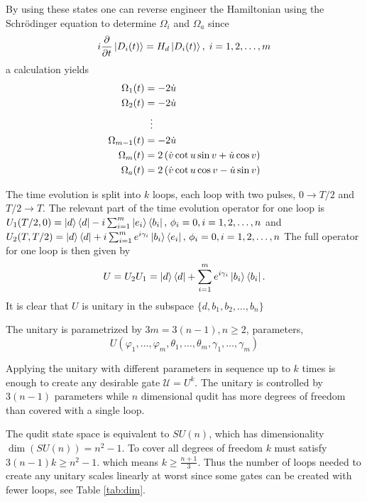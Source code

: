 By using these states one can reverse engineer the Hamiltonian using the Schrödinger equation to determine $\Omega_i$ and $\Omega_a$ since 
\begin{equation}
i\pdv{}{t}\ket{D_i(t)} = H_d\ket{D_i(t)},\; i = 1,2,\dots,m
\end{equation}
a calculation yields
\begin{equation}
\begin{aligned}
\Omega_1(t) &= -2\dot{u}
\\ 
\Omega_2(t) &= -2\dot{u}
\\
&\hspace{2mm}\vdots
\\
\Omega_{m-1}(t) &= -2\dot{u}
\\
\Omega_m(t) &= 2\left(\dot{v}\cot u\sin v + \dot{u}\cos v \right)
\\
\Omega_a(t) &= 2\left(\dot{v}\cot u\cos v - \dot{u}\sin v \right)
\end{aligned}
\end{equation}

The time evolution is split into $k$ loops, each loop with two pulses, $0 \longrightarrow T/2$ and $T/2 \longrightarrow T$. The relevant part of the time evolution operator for one loop is  
$U_1(T/2,0) = \ket{d}\bra{d} -i\sum_{i = 1}^m \ket{e_i}\bra{b_i},\, \phi_i = 0, i = 1,2,\dots,n$ and $U_2(T,T/2) = \ket{d}\bra{d} + i\sum_{i = 1}^m e^{i\gamma_i}\ket{b_i}\bra{e_i},\, \phi_i = 0, i = 1,2,\dots,n $
The full operator for one loop is then given by 
\begin{equation}
U = U_2U_1 = \ket{d}\bra{d} + \sum_{i = 1}^{m}e^{i\gamma_i}\ket{b_i}\bra{b_i}.
\end{equation}
It is clear that $U$ is unitary in the subspace $\{d,b_1,b_2,\dots, b_n\}$

The unitary is parametrized by $3m = 3(n-1), n\geq 2$, parameters,
\begin{equation}
U(\varphi_1,\dots,\varphi_m,\theta_1,\dots,\theta_m,\gamma_1,\dots,\gamma_m) 
\end{equation} 

Applying the unitary with different parameters in sequence up to $k$ times is enough to create any desirable gate $\mathcal{U} = U^k$. The unitary is controlled by $3(n-1)$ parameters while $n$ dimensional qudit has more degrees of freedom than covered with a single loop.

The qudit state space is equivalent to $SU(n)$, which has dimensionality $\dim(SU(n)) = n^2 -1$. To cover all degrees of freedom $k$ must satisfy $3(n-1)k \geq n^2 -1$.
which means $k \geq \frac{n+1}{3}$. Thus the number of loops needed to create any unitary scales linearly at worst since some gates can be created with fewer loops, see Table \ref{tab:dim}. 

